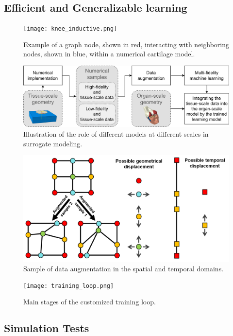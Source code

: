 \documentclass[12pt,a4paper]{report}
\begin{document}
\subsection{Efficient and Generalizable learning}
%

\begin{figure}\centering
\texttt{[image: knee\_inductive.png]}
\caption{Example of a graph node, shown in red, interacting with neighboring nodes, shown in blue, within a numerical cartilage model.}\label{fig:knee_inductive}
\end{figure}

\begin{figure}\centering
\includegraphics[width=1\linewidth,keepaspectratio]{inductive.png}
\caption{Illustration of the role of different models at different scales in surrogate modeling.}\label{fig:inductive}
\end{figure}

\begin{figure}\centering
\includegraphics[width=0.8\linewidth,keepaspectratio]{augmentation.png}
\caption{Sample of data augmentation in the spatial and temporal domains.}\label{fig:augmentation}
\end{figure}

\begin{figure}\centering
\texttt{[image: training\_loop.png]}
\caption{Main stages of the customized training loop.}\label{fig:training_loop}
\end{figure}

\subsection{Simulation Tests}
%
\end{document}
